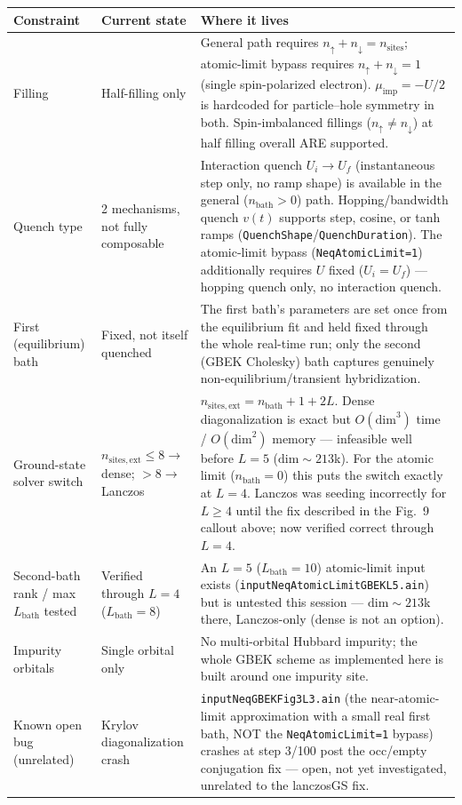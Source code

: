 \documentclass[11pt]{article}
\begin{document}
\begin{table}[H]
  \centering
  \small
  \begin{tabular}{p{3.1cm}p{3.4cm}p{7.5cm}}
    \toprule
    Constraint & Current state & Where it lives \\
    \midrule
    Filling &
    Half-filling only &
    General path requires $n_\uparrow+n_\downarrow=n_\mathrm{sites}$;
    atomic-limit bypass requires $n_\uparrow+n_\downarrow=1$ (single
    spin-polarized electron). $\mu_\mathrm{imp}=-U/2$ is hardcoded for
    particle--hole symmetry in both. Spin-imbalanced fillings
    ($n_\uparrow\neq n_\downarrow$) at half filling overall ARE
    supported. \\
    \addlinespace
    Quench type &
    2 mechanisms, not fully composable &
    Interaction quench $U_i\to U_f$ (instantaneous step only, no ramp
    shape) is available in the general ($n_\mathrm{bath}>0$) path.
    Hopping/bandwidth quench $v(t)$ supports step, cosine, or tanh ramps
    (\texttt{QuenchShape}/\texttt{QuenchDuration}). The atomic-limit
    bypass (\texttt{NeqAtomicLimit=1}) additionally requires $U$ fixed
    ($U_i=U_f$) --- hopping quench only, no interaction quench. \\
    \addlinespace
    First (equilibrium) bath &
    Fixed, not itself quenched &
    The first bath's parameters are set once from the equilibrium fit
    and held fixed through the whole real-time run; only the second
    (GBEK Cholesky) bath captures genuinely non-equilibrium/transient
    hybridization. \\
    \addlinespace
    Ground-state solver switch &
    $n_\mathrm{sites,ext}\le8\to$ dense; $>8\to$ Lanczos &
    $n_\mathrm{sites,ext}=n_\mathrm{bath}+1+2L$. Dense diagonalization is
    exact but $O(\mathrm{dim}^3)$ time / $O(\mathrm{dim}^2)$ memory ---
    infeasible well before $L=5$ ($\mathrm{dim}\sim213$k). For the
    atomic limit ($n_\mathrm{bath}=0$) this puts the switch exactly at
    $L=4$. Lanczos was seeding incorrectly for $L\ge4$ until the fix
    described in the Fig.\ 9 callout above; now verified correct through
    $L=4$. \\
    \addlinespace
    Second-bath rank / max $L_\mathrm{bath}$ tested &
    Verified through $L=4$ ($L_\mathrm{bath}=8$) &
    An $L=5$ ($L_\mathrm{bath}=10$) atomic-limit input exists
    (\texttt{inputNeqAtomicLimitGBEKL5.ain}) but is untested this
    session --- $\mathrm{dim}\sim213$k there, Lanczos-only (dense is not
    an option). \\
    \addlinespace
    Impurity orbitals &
    Single orbital only &
    No multi-orbital Hubbard impurity; the whole GBEK scheme as
    implemented here is built around one impurity site. \\
    \addlinespace
    Known open bug (unrelated) &
    Krylov diagonalization crash &
    \texttt{inputNeqGBEKFig3L3.ain} (the near-atomic-limit approximation
    with a small real first bath, NOT the \texttt{NeqAtomicLimit=1}
    bypass) crashes at step 3/100 post the occ/empty conjugation fix ---
    open, not yet investigated, unrelated to the lanczosGS fix. \\
    \bottomrule
  \end{tabular}
\end{table}
\end{document}
